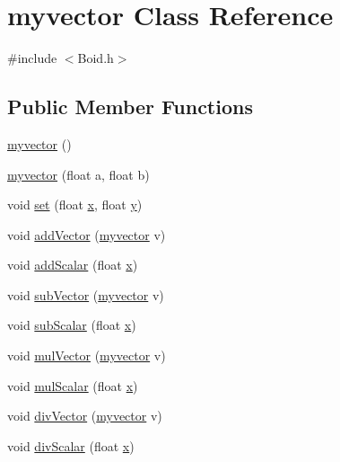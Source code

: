 \hypertarget{classmyvector}{}\section{myvector Class Reference}
\label{classmyvector}


{\ttfamily \#include $<$Boid.\+h$>$}

\subsection*{Public Member Functions}
\begin{DoxyCompactItemize}
\item 
\hyperlink{classmyvector_a14f6044bcf6e97fbe98dd5b59a91de9b}{myvector} ()
\item 
\hyperlink{classmyvector_aae4378de3a05547573e5c557547d29c6}{myvector} (float a, float b)
\item 
void \hyperlink{classmyvector_a53d8fcdcc0eaf2bef92e3a75effbb29d}{set} (float \hyperlink{classmyvector_a1e3915c15a349ccf949bb1751a5601c7}{x}, float \hyperlink{classmyvector_a44a88317051b0eacb7d9a1fb341879ae}{y})
\item 
void \hyperlink{classmyvector_a9de9660a79b1ab91b46e19764e45c762}{add\+Vector} (\hyperlink{classmyvector}{myvector} v)
\item 
void \hyperlink{classmyvector_a0d75094dd9d203f3631804c25081e6e1}{add\+Scalar} (float \hyperlink{classmyvector_a1e3915c15a349ccf949bb1751a5601c7}{x})
\item 
void \hyperlink{classmyvector_aa95fab10c88bb820a1df1a81b8a99e5a}{sub\+Vector} (\hyperlink{classmyvector}{myvector} v)
\item 
void \hyperlink{classmyvector_aae72e5012c3f1174c2088726c007b72d}{sub\+Scalar} (float \hyperlink{classmyvector_a1e3915c15a349ccf949bb1751a5601c7}{x})
\item 
void \hyperlink{classmyvector_a195cbe72f741ec0157e41682ef46955d}{mul\+Vector} (\hyperlink{classmyvector}{myvector} v)
\item 
void \hyperlink{classmyvector_a1df8c126386ada675bedcfc0d669dd9b}{mul\+Scalar} (float \hyperlink{classmyvector_a1e3915c15a349ccf949bb1751a5601c7}{x})
\item 
void \hyperlink{classmyvector_a94f0319a79e86f455620ebd972de5a51}{div\+Vector} (\hyperlink{classmyvector}{myvector} v)
\item 
void \hyperlink{classmyvector_a6f13869f698e6d04eec62eda846f1c89}{div\+Scalar} (float \hyperlink{classmyvector_a1e3915c15a349ccf949bb1751a5601c7}{x})

\end{DoxyCompactItemize}
